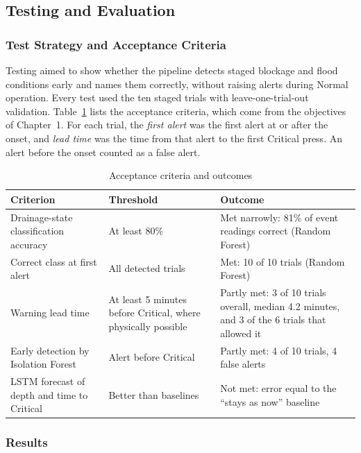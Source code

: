\documentclass[12pt, a4paper]{article}
\begin{document}
\subsection{Testing and Evaluation}
\label{sec:evaluation}

\subsubsection{Test Strategy and Acceptance Criteria}

Testing aimed to show whether the pipeline detects staged blockage and flood conditions early and names them correctly, without raising alerts during Normal operation. Every test used the ten staged trials with leave-one-trial-out validation. Table~\ref{tab:acceptance} lists the acceptance criteria, which come from the objectives of Chapter~1. For each trial, the \emph{first alert} was the first alert at or after the onset, and \emph{lead time} was the time from that alert to the first Critical press. An alert before the onset counted as a false alert.

\begin{table}[H]
\centering

\begin{tabular}{|p{4.2cm}|p{4.4cm}|p{5.4cm}|}
\hline
\textbf{Criterion} & \textbf{Threshold} & \textbf{Outcome} \\
\hline
Drainage-state classification accuracy & At least 80\% & Met narrowly: 81\% of event readings correct (Random Forest) \\
\hline
Correct class at first alert & All detected trials & Met: 10 of 10 trials (Random Forest) \\
\hline
Warning lead time & At least 5 minutes before Critical, where physically possible & Partly met: 3 of 10 trials overall, median 4.2 minutes, and 3 of the 6 trials that allowed it \\
\hline
Early detection by Isolation Forest & Alert before Critical & Partly met: 4 of 10 trials, 4 false alerts \\
\hline
LSTM forecast of depth and time to Critical & Better than baselines & Not met: error equal to the ``stays as now'' baseline \\
\hline
\end{tabular}
\caption{Acceptance criteria and outcomes}
\label{tab:acceptance}
\end{table}

\subsubsection{Results}
\end{document}

